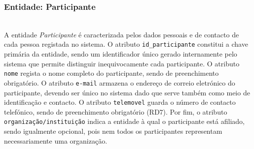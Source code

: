 \documentclass[runningheads]{llncs}
\begin{document}
                    \vspace{0.4cm}
                    \noindent\begin{minipage}{\textwidth}
                    \subsubsection{Entidade: Participante}\mbox{}\\

                    A entidade \textit{Participante} é caracterizada pelos dados pessoais e de contacto de cada 
                    pessoa registada no sistema. O atributo \texttt{id\_participante} constitui a chave primária da 
                    entidade, sendo um identificador único gerado internamente pelo sistema que permite 
                    distinguir inequivocamente cada participante. O atributo \texttt{nome} regista o nome completo 
                    do participante, sendo de preenchimento obrigatório. O atributo \texttt{e-mail} armazena o 
                    endereço de correio eletrónico do participante, devendo ser único no sistema dado que serve 
                    também como meio de identificação e contacto. O atributo \texttt{telemovel} guarda o número
                    de contacto telefónico, sendo de preenchimento obrigatório (RD7). Por fim, o atributo 
                    \texttt{organização/instituição} indica a entidade à qual o participante está afiliado, sendo 
                    igualmente opcional, pois nem todos os participantes representam necessariamente uma organização.


\end{minipage}
\end{document}

